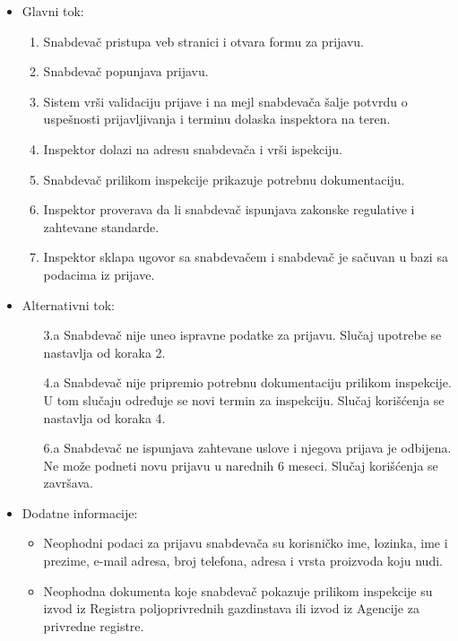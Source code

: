 \begin{itemize}
\begin{itemize}
		\end{itemize}		
	\item Glavni tok:
		\begin{enumerate}
		    \item Snabdevač pristupa veb stranici i otvara formu za prijavu.
		    \item Snabdevač popunjava prijavu.
		    \item Sistem vrši validaciju prijave i na mejl snabdevača šalje potvrdu o uspešnosti prijavljivanja i terminu dolaska inspektora na teren. 
		    \item Inspektor dolazi na adresu snabdevača i vrši ispekciju.
		    \item Snabdevač prilikom inspekcije prikazuje potrebnu dokumentaciju.
		    \item Inspektor proverava da li snabdevač ispunjava zakonske regulative i zahtevane standarde.
		    \item Inspektor sklapa ugovor sa snabdevačem i snabdevač je sačuvan u bazi sa podacima iz prijave.
		\end{enumerate}
	\item Alternativni tok:
		\begin{itemize}
    		\item[3.a] Snabdevač nije uneo ispravne podatke za prijavu. Slučaj upotrebe se nastavlja od koraka 2.
		    \item[4.a] Snabdevač nije pripremio potrebnu dokumentaciju prilikom inspekcije. U tom slučaju određuje se novi termin za inspekciju. Slučaj korišćenja se nastavlja od koraka 4.
		    \item[6.a] Snabdevač ne ispunjava zahtevane uslove i njegova prijava je odbijena. Ne može podneti novu prijavu u narednih 6 meseci. Slučaj korišćenja se završava.
		\end{itemize}
	\item Dodatne informacije:
		\begin{itemize}
			\item Neophodni podaci za prijavu snabdevača su korisničko ime, lozinka, ime i prezime, e-mail adresa, broj telefona, adresa i vrsta proizvoda koju nudi. 
			\item Neophodna dokumenta koje snabdevač pokazuje prilikom inspekcije su izvod iz Registra poljoprivrednih gazdinstava ili izvod iz Agencije za privredne registre.
		\end{itemize}						
\end{itemize}